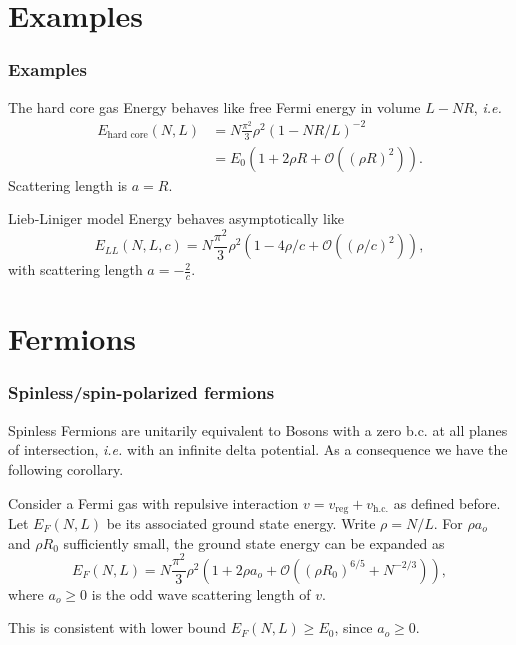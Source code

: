 \documentclass{beamer}[10]
\newcommand{\ie}{\emph{i.e.} }
\begin{document}
\section{Examples}
\begin{frame}
	\frametitle{Examples}
	\begin{block}{The hard core gas}
		Energy behaves like free Fermi energy in volume $ L-NR $, \ie \begin{equation}
		\begin{aligned}
		E_{\text{hard core}}(N,L)&=N\frac{\pi^2}{3}\rho^2 (1-NR/L)^{-2}\\&= E_0\left(1+2\rho R+\mathcal{O}\left((\rho R)^2\right)\right).
		\end{aligned}
		\end{equation}
		Scattering length is $ a=R $.
	\end{block}
	\begin{block}{Lieb-Liniger model}
		Energy behaves asymptotically like
		\begin{equation}
		E_{LL}(N,L,c)=N\frac{\pi^2}{3}\rho^2\left(1-4\rho/c+\mathcal{O}\left((\rho/c)^2\right)\right),
		\end{equation}
		with scattering length $ a=-\frac{2}{c} $.
	\end{block}
\end{frame}


\section{Fermions}
\begin{frame}
	\frametitle{Spinless/spin-polarized fermions}
	Spinless Fermions are unitarily equivalent to Bosons with a zero b.c. at all planes of intersection, \ie with an infinite delta potential. As a consequence we have the following corollary. 
	\begin{theorem}\label{TheoremFermion}
		Consider a Fermi gas with repulsive interaction  $v=v_{\text{reg}}+v_{\text{h.c.}}$ as defined before. Let $ E_F(N,L)$ be its associated ground state energy. Write $\rho=N/L$. For $\rho a_o$ and $\rho R_0$ sufficiently small, the ground state energy can be expanded as 
		\begin{equation}
		E_F(N,L)=N\frac{\pi^2}{3}\rho^2\left(1+2\rho a_o+\mathcal{O}\left(\left(\rho R_0\right)^{6/5}+N^{-2/3}\right)\right),
		\end{equation}
		where $ a_o\geq0 $ is the odd wave scattering length of $v$. 
	\end{theorem} 
	This is consistent with lower bound $ E_F(N,L)\geq E_0 $, since $ a_o\geq 0 $.
\end{frame}
\end{document}

